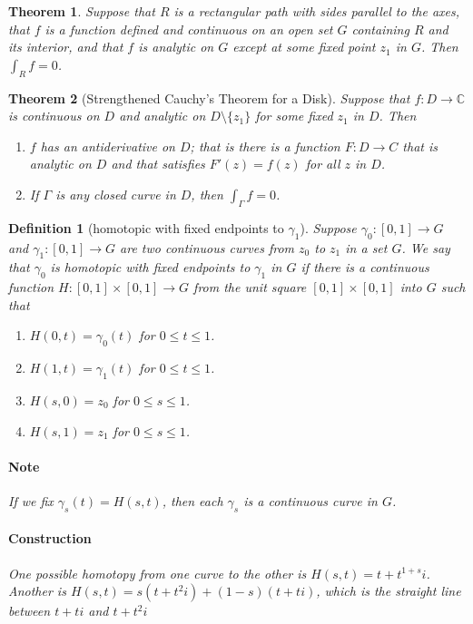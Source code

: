\documentclass[a4paper]{article}
\newtheorem{definition}{Definition}
\newtheorem{theorem}{Theorem}
\newcommand{\C}{\mathbb{C}}
\begin{document}
\begin{theorem}
  Suppose that \(R\) is a rectangular path with sides parallel to the axes, that \(f\) is a function defined and continuous on an open set \(G\) containing \(R\) and its interior, and that \(f\) is analytic on \(G\) except at some fixed point \(z_1\) in \(G\). 
  Then \(\int_R f = 0\).
\end{theorem}






\begin{theorem}[Strengthened Cauchy's Theorem for a Disk]
  Suppose that \(f : D \to \C\) is continuous on \(D\) and analytic on \(D \setminus \{z_1\}\) for some fixed \(z_1\) in \(D\). 
  Then
  \begin{enumerate}
    \item \(f\) has an antiderivative on \(D\); that is there is a function \(F : D \to C\) that is analytic on \(D\) and that satisfies \(F'(z) = f(z)\) for all \(z\) in \(D\).
    \item If \(\Gamma\) is any closed curve in \(D\), then \(\int_\Gamma f = 0\).
  \end{enumerate}
\end{theorem}


\begin{definition}[homotopic with fixed endpoints to \(\gamma_1\)]
  Suppose \(\gamma_0 : [0, 1] \to G \) and \(\gamma_1 : [0, 1] \to G \) are two continuous curves from \(z_0\) to \(z_1\) in a set \(G\). 
  We say that \(\gamma_0\) is homotopic with fixed endpoints to \(\gamma_1\) in \(G\) if there is a continuous function \(H : [0, 1] \times [0, 1] \to G\) from the unit square \([0, 1] \times [0, 1]\) into \(G\) such that 
  \begin{enumerate}
    \item \(H(0, t) = \gamma_0(t)\)  for \(0 \leq t \leq 1\). 
    \item \(H(1, t) = \gamma_1(t)\)  for \(0 \leq t \leq 1\). 
    \item \(H(s, 0) = z_0\) for \(0 \leq s \leq 1\). 
    \item \(H(s, 1) = z_1\)  for \(0 \leq s \leq 1\). 
  \end{enumerate}

  \paragraph{Note}
  If we fix \(\gamma_s(t) = H(s, t)\), then each \(\gamma_s\) is a continuous curve in \(G\). 

  \paragraph{Construction}
  One possible homotopy from one curve to the other is \(H(s, t) = t + t^{1 + s} i\).
   Another is \(H(s, t) = s(t + t^2 i) + (1 - s)(t + ti)\), which is the straight line between \(t + ti\) and \(t + t^2 i\)
\end{definition}
\end{document}
